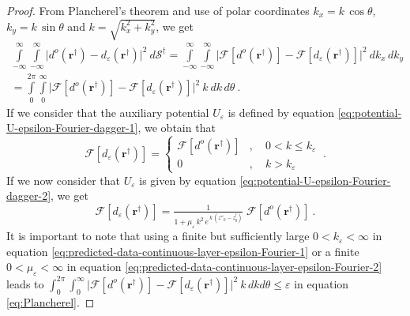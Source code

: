 \begin{proof}
	From Plancherel's theorem \citep[][ p. 119]{bracewell1999} and use of polar coordinates 
	$k_{x} = k \, \cos\theta$, $k_{y} = k \, \sin\theta$ and $k = \sqrt{k_{x}^{2} + k_{y}^{2}}$,
	we get
	\begin{equation}
		\begin{split}
			\int\limits_{-\infty}^{\infty} \int\limits_{-\infty}^{\infty}
			\vert 
			d^{o}(\mathbf{r}^{\dagger}) - d_{\varepsilon}(\mathbf{r}^{\dagger})
			\vert^{2} 
			\: d\mathcal{S}^{\dagger} = 
			\int\limits_{-\infty}^{\infty} \int\limits_{-\infty}^{\infty}
			\vert \mathcal{F} [ d^{o}(\mathbf{r}^{\dagger}) ] - \mathcal{F} [
			d_{\varepsilon}(\mathbf{r}^{\dagger}) ] \vert^{2} 
			\: d k_{x} \, d k_{y} \\
			= \int\limits_{0}^{2\pi} \int\limits_{0}^{\infty}
			\vert \mathcal{F} [ d^{o}(\mathbf{r}^{\dagger}) ] - \mathcal{F} [
			d_{\varepsilon}(\mathbf{r}^{\dagger}) ] \vert^{2} \: k \: d k \, d \theta \: .
		\end{split}
		\label{eq:Plancherel}
	\end{equation}
	If we consider that the auxiliary potential $U_{\varepsilon}$ is defined by equation \ref{eq:potential-U-epsilon-Fourier-dagger-1},
	we obtain that 
	\begin{equation}
		\mathcal{F} [ d_{\varepsilon}(\mathbf{r}^{\dagger}) ] = 
		\begin{cases}
			\mathcal{F} [ d^{o}(\mathbf{r}^{\dagger}) ] &
			, \quad 0 < k \le k_{\varepsilon} \\
			0 & , \quad k > k_{\varepsilon} 
		\end{cases} \: .
		\label{eq:predicted-data-continuous-layer-epsilon-Fourier-1}
	\end{equation}
	If we now consider that $U_{\varepsilon}$ is given by equation \ref{eq:potential-U-epsilon-Fourier-dagger-2},
	we get
	\begin{equation}
		\mathcal{F} [ d_{\varepsilon}(\mathbf{r}^{\dagger}) ] = 
		\tfrac{1}{1 + \mu_{\varepsilon} \, k^{2} \, e^{\, k \, (z''_{0} - z^{\dagger}_{0})}} \; 
		\mathcal{F} [ d^{o}(\mathbf{r}^{\dagger}) ] \: .
		\label{eq:predicted-data-continuous-layer-epsilon-Fourier-2}
	\end{equation}
	It is important to note that using a finite but sufficiently large $0 < k_{\varepsilon} < \infty$ in equation 
	\ref{eq:predicted-data-continuous-layer-epsilon-Fourier-1} or a finite $0 < \mu_{\varepsilon} < \infty$ in 
	equation \ref{eq:predicted-data-continuous-layer-epsilon-Fourier-2} leads to  
	$\int_{0}^{2\pi} \int_{0}^{\infty} \vert \mathcal{F} [ d^{o}(\mathbf{r}^{\dagger}) ] - \mathcal{F} [d_{\varepsilon}(\mathbf{r}^{\dagger}) ] \vert^{2} \: k \, dkd\theta \le \varepsilon$ in equation \ref{eq:Plancherel}. 

\end{proof}
